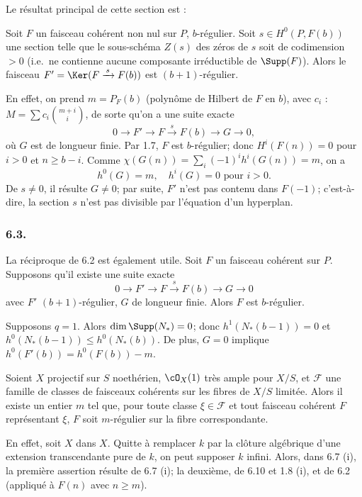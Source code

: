 Le r\'esultat principal de cette section est :

\begin{theoreme}[6.2]
Soit $F$ un faisceau coh\'erent non nul sur $P$, $b$-r\'egulier. Soit $s \in H^0(P, F(b))$ une section telle que le sous-sch\'ema $Z(s)$ des z\'eros de $s$ soit de codimension $> 0$ (i.e.\ ne contienne aucune composante irr\'eductible de $\Supp(F)$). Alors le faisceau $F' = \Ker(F \xrightarrow{\,s\,} F(b))$ est $(b+1)$-r\'egulier.
\end{theoreme}

En effet, on prend $m = P_F(b)$ (polyn\^ome de Hilbert de $F$ en $b$), avec $c_i$ : $M = \sum c_i \binom{m+i}{i}$, de sorte qu'on a une suite exacte
\[
0 \to F' \to F \xrightarrow{\,s\,} F(b) \to G \to 0,
\]
o\`u $G$ est de longueur finie. Par 1.7, $F$ est $b$-r\'egulier; donc $H^i(F(n)) = 0$ pour $i > 0$ et $n \geq b-i$. Comme $\chi(G(n)) = \sum_i (-1)^i h^i(G(n)) = m$, on a
\[
h^0(G) = m, \quad h^i(G) = 0 \text{ pour } i > 0.
\]
De $s \neq 0$, il r\'esulte $G \neq 0$; par suite, $F'$ n'est pas contenu dans $F(-1)$; c'est-\`a-dire, la section $s$ n'est pas divisible par l'\'equation d'un hyperplan.

\subsubsection*{6.3.}
La r\'eciproque de 6.2 est \'egalement utile. Soit $F$ un faisceau coh\'erent sur $P$. Supposons qu'il existe une suite exacte
\[
0 \to F' \to F \xrightarrow{\,s\,} F(b) \to G \to 0
\]
avec $F'$ $(b+1)$-r\'egulier, $G$ de longueur finie. Alors $F$ est $b$-r\'egulier.

Supposons $q = 1$. Alors $\dim \Supp(N_*) = 0$; donc $h^1(N_*(b-1)) = 0$ et $h^0(N_*(b-1)) \leq h^0(N_*(b))$. De plus, $G = 0$ implique $h^0(F'(b)) = h^0(F(b)) - m$.

\begin{corollaire}[6.8. (Grothendieck)]
Soient $X$ projectif sur $S$ noeth\'erien, $\cO_X(1)$ tr\`es ample pour $X/S$, et $\mathcal{F}$ une famille de classes de faisceaux coh\'erents sur les fibres de $X/S$ limit\'ee. Alors il existe un entier $m$ tel que, pour toute classe $\xi \in \mathcal{F}$ et tout faisceau coh\'erent $F$ repr\'esentant $\xi$, $F$ soit $m$-r\'egulier sur la fibre correspondante.
\end{corollaire}

En effet, soit $X$ dans $X$. Quitte \`a remplacer $k$ par la cl\^oture alg\'ebrique d'une extension transcendante pure de $k$, on peut supposer $k$ infini. Alors, dans 6.7 (i), la premi\`ere assertion r\'esulte de 6.7 (i); la deuxi\`eme, de 6.10 et 1.8 (i), et de 6.2 (appliqu\'e \`a $F(n)$ avec $n \geq m$).


